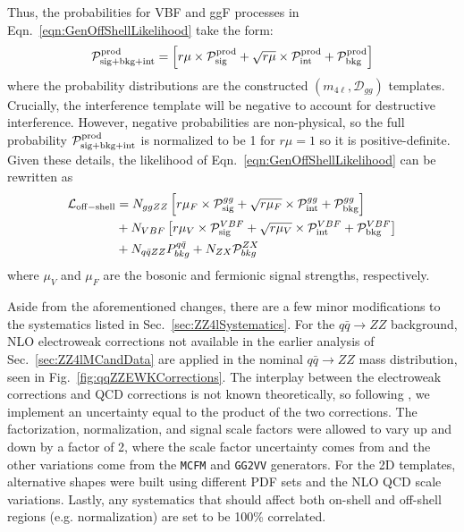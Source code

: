 Thus, the probabilities for VBF and ggF processes in Eqn.~\ref{eqn:GenOffShellLikelihood} take the form:
\begin{equation}
\mathcal{P}_{\rm sig+bkg+int}^{\rm prod} = \left[r\mu\times\mathcal{P}_{\rm sig}^{\rm prod} + \sqrt{r\mu}\times\mathcal{P}_{\rm int}^{\rm prod} + \mathcal{P}_{\rm bkg}^{\rm prod} \right]
\end{equation}
where the probability distributions are the constructed $(m_{4\ell},\mathcal{D}_{gg})$ templates. Crucially, the interference template will be negative to account for destructive interference. However, negative probabilities are non-physical, so the full probability $\mathcal{P}_{\rm sig+bkg+int}^{\rm prod}$ is normalized to be 1 for $r\mu=1$ so it is positive-definite. Given these details, the likelihood of Eqn.~\ref{eqn:GenOffShellLikelihood} can be rewritten as
\begin{equation}
\begin{split}
\mathcal{L}_{\rm off-shell} &= N_{ggZZ}\left[r\mu_{F}\times\mathcal{P}_{\rm sig}^{gg} + \sqrt{r\mu_{F}}\times\mathcal{P}_{\rm int}^{gg} + \mathcal{P}_{\rm bkg}^{gg}\right] \\
&+ N_{VBF}\left[r\mu_{V}\times\mathcal{P}_{\rm sig}^{VBF} + \sqrt{r\mu_{V}}\times\mathcal{P}_{\rm int}^{VBF} + \mathcal{P}_{\rm bkg}^{VBF}\right] \\
&+ N_{q\bar{q}ZZ}P_{bkg}^{q\bar{q}} + N_{ZX}\mathcal{P}_{bkg}^{ZX}
\end{split}
\end{equation}
where $\mu_V$ and $\mu_F$ are the bosonic and fermionic signal strengths, respectively.

Aside from the aforementioned changes, there are a few minor modifications to the systematics listed in Sec.~\ref{sec:ZZ4lSystematics}. For the $q\bar{q}\rightarrow ZZ$ background, NLO electroweak corrections \cite{Baglio:1307.4331,Bierweiler:1312,Gieseke:2014gka} not available in the earlier analysis of Sec.~\ref{sec:ZZ4lMCandData} are applied in the nominal $q\bar{q}\rightarrow ZZ$ mass distribution, seen in Fig.~\ref{fig:qqZZEWKCorrections}. The interplay between the electroweak corrections and QCD corrections is not known theoretically, so following \cite{kasprzikpriv}, we implement an uncertainty equal to the product of the two corrections. The factorization, normalization, and signal scale factors were allowed to vary up and down by a factor of 2, where the scale factor uncertainty comes from \cite{Passarino:2013bha} and the other variations come from the {\tt MCFM} and {\tt GG2VV} generators. For the 2D templates, alternative shapes were built using different PDF sets and the NLO QCD scale variations. Lastly, any systematics that should affect both on-shell and off-shell regions (e.g. normalization) are set to be 100\% correlated.

